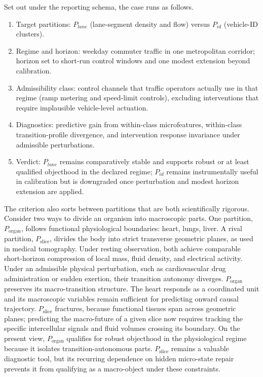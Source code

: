 Set out under the reporting schema, the case runs as follows.

\begin{enumerate}
	\item
	      Target partitions: $P_{lane}$ (lane-segment density and flow)
	      versus $P_{id}$ (vehicle-ID clusters).
	\item
	      Regime and horizon: weekday commuter traffic in one metropolitan
	      corridor; horizon set to short-run control windows and one modest
	      extension beyond calibration.
	\item
	      Admissibility class: control channels that traffic operators
	      actually use in that regime (ramp metering and speed-limit
	      controls), excluding interventions that require implausible
	      vehicle-level actuation.
	\item
	      Diagnostics: predictive gain from within-class microfeatures,
	      within-class transition-profile divergence, and intervention
	      response invariance under admissible perturbations.
	\item
	      Verdict: $P_{lane}$ remains comparatively stable and supports robust
	      or at least qualified objecthood in the declared regime; $P_{id}$
	      remains instrumentally useful in calibration but is downgraded once
	      perturbation and modest horizon extension are applied.
\end{enumerate}

The criterion also sorts between partitions that are both scientifically
rigorous. Consider two ways to divide an
organism into macroscopic parts. One partition, \(P_{\text{organ}}\),
follows functional physiological boundaries: heart, lungs, liver. A
rival partition, \(P_{\text{slice}}\), divides the body into strict
transverse geometric planes, as used in medical tomography. Under
resting observation, both achieve comparable short-horizon compression of
local mass, fluid density, and electrical activity. Under an admissible
physical perturbation, such as cardiovascular drug administration or
sudden exertion, their transition autonomy diverges.
\(P_{\text{organ}}\) preserves its macro-transition structure. The heart
responds as a coordinated unit and its macroscopic variables remain
sufficient for predicting onward causal trajectory.
\(P_{\text{slice}}\) fractures, because functional tissues span across
geometric planes; predicting the macro-future of a given slice now
requires tracking the specific intercellular signals and fluid volumes
crossing its boundary. On the present view,
\(P_{\text{organ}}\) qualifies for robust objecthood in the physiological
regime because it isolates transition-autonomous parts.
\(P_{\text{slice}}\) remains a valuable diagnostic tool, but its
recurring dependence on hidden micro-state repair prevents it from
qualifying as a macro-object under these constraints.

